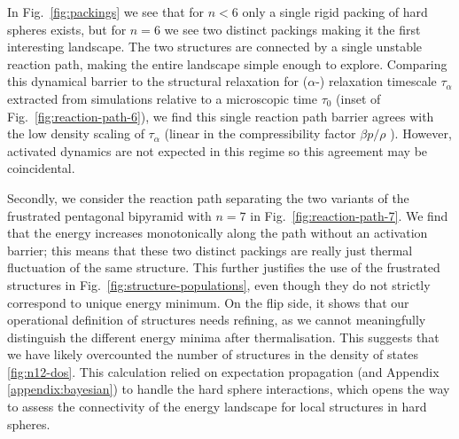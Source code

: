 \documentclass[11pt,twoside]{report}
\begin{document}
In Fig.\ \ref{fig:packings} we see that for $n < 6$ only a single rigid packing of hard spheres exists, but for $n=6$ we see two distinct packings making it the first interesting landscape.
The two structures are connected by a single unstable reaction path, making the entire landscape simple enough to explore.
Comparing this dynamical barrier to the structural relaxation for ($\alpha$-) relaxation timescale $\tau_\alpha$ extracted from simulations relative to a microscopic time $\tau_0$ (inset of Fig.\ \ref{fig:reaction-path-6}), we find this single reaction path barrier agrees with the low density scaling of $\tau_\alpha$ (linear in the compressibility factor $\beta p / \rho$ \cite{BerthierPRE2009}).
However, activated dynamics are not expected in this regime so this agreement may be coincidental.

Secondly, we consider the reaction path separating the two variants of the frustrated pentagonal bipyramid with $n=7$ in Fig.\ \ref{fig:reaction-path-7}.
We find that the energy increases monotonically along the path without an activation barrier; this means that these two distinct packings are really just thermal fluctuation of the same structure.
This further justifies the use of the frustrated structures in Fig.\ \ref{fig:structure-populations}, even though they do not strictly correspond to unique energy minimum.
On the flip side, it shows that our operational definition of structures needs refining, as we cannot meaningfully distinguish the different energy minima after thermalisation.
This suggests that we have likely overcounted the number of structures in the density of states \ref{fig:n12-dos}.
This calculation relied on expectation propagation \cite{MinkaUAI2001,Minka2001,Rasmussen2006,Cunningham2011} (and Appendix \ref{appendix:bayesian}) to handle the hard sphere interactions, which opens the way to assess the connectivity of the energy landscape for local structures in hard spheres.
\end{document}
